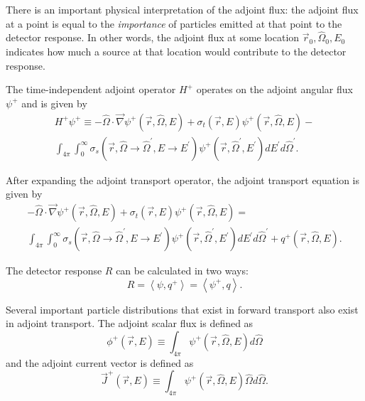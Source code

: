 There is an important physical interpretation of the adjoint flux: the adjoint flux at a point is equal to the \textit{importance} of particles emitted at that point to the detector response.
In other words, the adjoint flux at some location $\vec{r}_0, \hat{\Omega}_0, E_0$ indicates how much a source at that location would contribute to the detector response.

The time-independent adjoint operator $H^+$ operates on the adjoint angular flux $\psi^+$ and is given by
\begin{multline}\label{eq:bg:rt:adjoint_transport_operator}
  H^+\psi^+ \equiv
  -\hat{\Omega}\cdot\vec{\nabla}\psi^+\left(\vec{r},\hat{\Omega},E\right) +
  \sigma_t\left(\vec{r},E\right)\psi^+\left(\vec{r},\hat{\Omega},E\right) - \\
  \int_{4\pi}\int_0^\infty\sigma_s\left(\vec{r},\hat{\Omega}\rightarrow\hat{\Omega}^\prime,E\rightarrow E^\prime\right)\psi^+\left(\vec{r},\hat{\Omega}^\prime,E^\prime\right)dE^\prime d\hat{\Omega}^\prime.
\end{multline}

After expanding the adjoint transport operator, the adjoint transport equation is given by
\begin{multline}\label{eq:bg:rt:adjoint_transport_equation}
  -\hat{\Omega}\cdot\vec{\nabla}\psi^+\left(\vec{r},\hat{\Omega},E\right) +
  \sigma_t\left(\vec{r},E\right)\psi^+\left(\vec{r},\hat{\Omega},E\right) = \\
  \int_{4\pi}\int_0^\infty\sigma_s\left(\vec{r},\hat{\Omega}\rightarrow\hat{\Omega}^\prime,E\rightarrow E^\prime\right)\psi^+\left(\vec{r},\hat{\Omega}^\prime,E^\prime\right)dE^\prime d\hat{\Omega}^\prime +
  q^+\left(\vec{r},\hat{\Omega},E\right).
\end{multline}

The detector response $R$ can be calculated in two ways:
\begin{equation}\label{eq:bg:rt:detector_response}
  R = \left<\psi,q^+\right>
    = \left<\psi^+,q\right>.
\end{equation}

Several important particle distributions that exist in forward transport also exist in adjoint transport.
The adjoint scalar flux is defined as
\begin{equation}\label{eq:bg:rt:adjoint_scalar_flux}
  \phi^+\left(\vec{r},E\right) \equiv
  \int_{4\pi}\psi^+\left(\vec{r},\hat{\Omega},E\right)d\hat{\Omega}
\end{equation}
and the adjoint current vector is defined as
\begin{equation}\label{eq:bg:rt:adjoint_current_vector}
  \vec{J}^+\left(\vec{r},E\right) \equiv
  \int_{4\pi}\psi^+\left(\vec{r},\hat{\Omega},E\right)\hat{\Omega} d\hat{\Omega}.
\end{equation}

